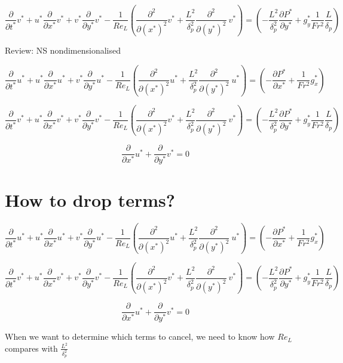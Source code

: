 \documentclass[11pt]{article}
\begin{document}
$$  \frac{\partial }{\partial t^*} v^* + u^*  \frac{\partial}{\partial x^*} v^* + v^* \frac{\partial}{\partial y^*} v^* -  \frac{1}{Re_L } ( \frac{\partial^2}{\partial (x^*)^2} v^* + \frac{L^2}{\delta_p^2} \frac{\partial^2}{\partial (y^*)^2} \ v^* ) =  (- \frac{L^2 }{\delta_p^2} \frac{\partial P^*}{\partial y^*} +g_y^*\frac{1}{Fr^2}\frac{L }{ \delta_p})$$


Review: NS nondimensionalised

$$\frac{\partial }{\partial t^*} u^* + u^*  \frac{\partial}{\partial x^* } u^* + v^*  \frac{\partial}{\partial y^*} u^* - \frac{1}{Re_L}  ( \frac{\partial^2}{\partial (x^*)^2} u^* + \frac{L^2}{\delta_p^2} \frac{\partial^2}{\partial (y^*)^2} \ u^* ) =  ( -  \frac{\partial P^*}{\partial x^*} + \frac{1}{Fr^2}g_x^* )$$


$$  \frac{\partial }{\partial t^*} v^* + u^*  \frac{\partial}{\partial x^*} v^* + v^* \frac{\partial}{\partial y^*} v^* -  \frac{1}{Re_L } ( \frac{\partial^2}{\partial (x^*)^2} v^* + \frac{L^2}{\delta_p^2} \frac{\partial^2}{\partial (y^*)^2} \ v^* ) =  (- \frac{L^2 }{\delta_p^2} \frac{\partial P^*}{\partial y^*} +g_y^*\frac{1}{Fr^2}\frac{L }{ \delta_p})$$

$$\frac{\partial }{\partial x^* } u^* + \frac{\partial}{\partial y^*} v^* =0 $$

\section{How to drop terms?}

$$\frac{\partial }{\partial t^*} u^* + u^*  \frac{\partial}{\partial x^* } u^* + v^*  \frac{\partial}{\partial y^*} u^* - \frac{1}{Re_L}  ( \frac{\partial^2}{\partial (x^*)^2} u^* + \frac{L^2}{\delta_p^2} \frac{\partial^2}{\partial (y^*)^2} \ u^* ) =  ( -  \frac{\partial P^*}{\partial x^*} + \frac{1}{Fr^2}g_x^* )$$


$$  \frac{\partial }{\partial t^*} v^* + u^*  \frac{\partial}{\partial x^*} v^* + v^* \frac{\partial}{\partial y^*} v^* -  \frac{1}{Re_L } ( \frac{\partial^2}{\partial (x^*)^2} v^* + \frac{L^2}{\delta_p^2} \frac{\partial^2}{\partial (y^*)^2} \ v^* ) =  (- \frac{L^2 }{\delta_p^2} \frac{\partial P^*}{\partial y^*} +g_y^*\frac{1}{Fr^2}\frac{L }{ \delta_p})$$

$$\frac{\partial }{\partial x^* } u^* + \frac{\partial}{\partial y^*} v^* =0 $$

When we want to determine which terms to cancel, we need to know how $Re_L$ compares with $\frac{L^2}{\delta_p^2}$
\end{document}
